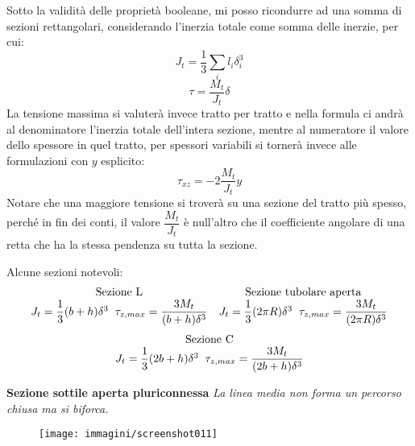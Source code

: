 \documentclass{article}
\begin{document}
\begin{adjustwidth}{2in}{}
			Sotto la validità delle proprietà booleane, mi posso ricondurre ad una somma di sezioni rettangolari, considerando l'inerzia totale come somma delle inerzie, per cui: 
			\[J_t = \dfrac{1}{3}\sum_il_i\delta^3_i\]
			\[ \tau = \dfrac{M_t}{J_t}\delta\]
			La tensione massima si valuterà invece tratto per tratto e nella formula ci andrà al denominatore l'inerzia totale dell'intera sezione, mentre al numeratore il valore dello spessore in quel tratto, per spessori variabili si tornerà invece alle formulazioni con $y$ esplicito: 
			\[ \tau_{xz} = -2\dfrac{M_t}{J_t}y \]
			Notare che una maggiore tensione si troverà su una sezione del tratto più spesso, perché in fin dei conti, il valore $\dfrac{M_t}{J_t}$ è null'altro che il coefficiente angolare di una retta che ha la stessa pendenza su tutta la sezione. \newline 
			
			Alcune sezioni notevoli:
			\[\begin{array}{ccc}
				\text{Sezione L} & \text{Sezione tubolare aperta} \\
				J_t = \dfrac{1}{3}(b+h)\delta^3 \hspace{0.2cm} \tau_{z,max} =\dfrac{3M_t}{(b+h)\delta^3}  & J_t = \dfrac{1}{3}(2\pi R)\delta^3\hspace{0.2cm}  \tau_{z,max} =\dfrac{3M_t}{(2\pi R)\delta^3}   
			\end{array}\]
			\[ \begin{array}{c}
				\text{Sezione C} \\
				J_t = \dfrac{1}{3}(2b+h)\delta^3 \hspace{0.2cm}  \tau_{z,max} =\dfrac{3M_t}{(2b+h)\delta^3} 
			\end{array}\]
		
		\textbf{{\Large Sezione sottile aperta pluriconnessa}}\newline
		\textit{La linea media non forma un percorso chiusa ma si biforca.}  
		\begin{figure}[H]
			\centering
			\texttt{[image: immagini/screenshot011]}
			\label{fig:screenshot011}
		\end{figure}
		

\end{adjustwidth}
\end{document}
